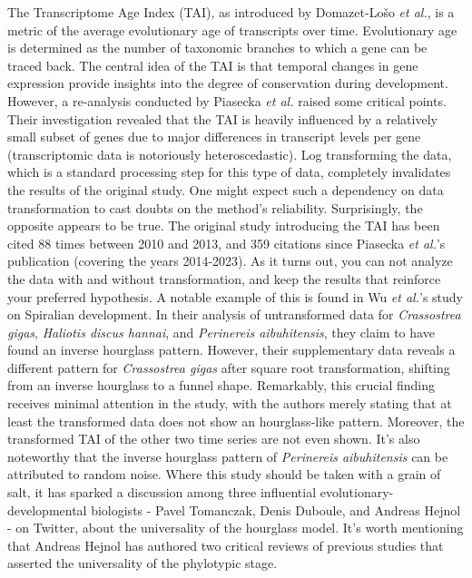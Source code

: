 The Transcriptome Age Index (TAI), as introduced by Domazet-Lošo \textit{et al.}, is a metric of the average evolutionary age of transcripts over time\cite{DomazetLoso2010}. Evolutionary age is determined as the number of taxonomic branches to which a gene can be traced back. The central idea of the TAI is that temporal changes in gene expression provide insights into the degree of conservation during development. However, a re-analysis conducted by Piasecka \textit{et al.} raised some critical points\cite{Piasecka2013}. Their investigation revealed that the TAI is heavily influenced by a relatively small subset of genes due to major differences in transcript levels per gene (transcriptomic data is notoriously heteroscedastic). Log transforming the data, which is a standard processing step for this type of data, completely invalidates the results of the original study. One might expect such a dependency on data transformation to cast doubts on the method's reliability. Surprisingly, the opposite appears to be true. The original study introducing the TAI has been cited 88 times between 2010 and 2013, and 359 citations since Piasecka \textit{et al.}'s publication (covering the years 2014-2023). As it turns out, you can not analyze the data with and without transformation, and keep the results that reinforce your preferred hypothesis. A notable example of this is found in Wu \textit{et al.}'s study on Spiralian development\cite{Wu2019}. In their analysis of untransformed data for \textit{Crassostrea gigas}, \textit{Haliotis discus hannai}, and \textit{Perinereis aibuhitensis}, they claim to have found an inverse hourglass pattern. However, their supplementary data reveals a different pattern for \textit{Crassostrea gigas} after square root transformation, shifting from an inverse hourglass to a funnel shape. Remarkably, this crucial finding receives minimal attention in the study, with the authors merely stating that at least the transformed data does not show an hourglass-like pattern. Moreover, the transformed TAI of the other two time series are not even shown. It's also noteworthy that the inverse hourglass pattern of \textit{Perinereis aibuhitensis} can be attributed to random noise. Where this study should be taken with a grain of salt, it has sparked a discussion among three influential evolutionary-developmental biologists - Pavel Tomanczak, Denis Duboule, and Andreas Hejnol - on Twitter, about the universality of the hourglass model. It's worth mentioning that Andreas Hejnol has authored two critical reviews of previous studies that asserted the universality of the phylotypic stage\cite{Dunn2018,hejnol2016}.




